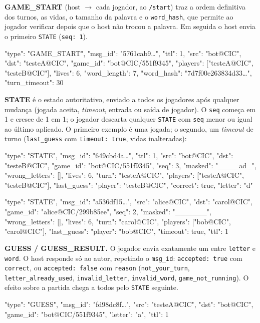 \documentclass[11pt,a4paper]{article}
\begin{document}
\textbf{GAME\_START} (host $\rightarrow$ cada jogador, ao \texttt{/start}) traz a ordem definitiva dos turnos, as vidas, o tamanho da palavra e o \texttt{word\_hash}, que permite ao jogador verificar depois que o host não trocou a palavra. Em seguida o host envia o primeiro \texttt{STATE} (\texttt{seq: 1}).
\begin{codigo}
{
  "type": "GAME_START",
  "msg_id": "5761cab9…",
  "ttl": 1,
  "src": "bot@CIC",
  "dst": "testeA@CIC",
  "game_id": "bot@CIC/551f9345",
  "players": ["testeA@CIC", "testeB@CIC"],
  "lives": 6,
  "word_length": 7,
  "word_hash": "7d7f00e263834d33…",
  "turn_timeout": 30
}
\end{codigo}
\textbf{STATE} é o estado autoritativo, enviado a todos os jogadores após qualquer mudança (jogada aceita, \emph{timeout}, entrada ou saída de jogador). O \texttt{seq} começa em 1 e cresce de 1 em 1; o jogador descarta qualquer \texttt{STATE} com \texttt{seq} menor ou igual ao último aplicado. O primeiro exemplo é uma jogada; o segundo, um \emph{timeout} de turno (\texttt{last\_guess} com \texttt{timeout: true}, vidas inalteradas):
\begin{codigo}
{
  "type": "STATE",
  "msg_id": "649cbd4a…",
  "ttl": 1,
  "src": "bot@CIC",
  "dst": "testeB@CIC",
  "game_id": "bot@CIC/551f9345",
  "seq": 3,
  "masked": "____ad_",
  "wrong_letters": [],
  "lives": 6,
  "turn": "testeA@CIC",
  "players": ["testeA@CIC", "testeB@CIC"],
  "last_guess": {"player": "testeB@CIC", "correct": true, "letter": "d"}
}
\end{codigo}
\begin{codigo}
{
  "type": "STATE",
  "msg_id": "a536df15…",
  "src": "alice@CIC",
  "dst": "carol@CIC",
  "game_id": "alice@CIC/299b85ee",
  "seq": 2,
  "masked": "______",
  "wrong_letters": [],
  "lives": 6,
  "turn": "carol@CIC",
  "players": ["bob@CIC", "carol@CIC"],
  "last_guess": {"player": "bob@CIC", "timeout": true},
  "ttl": 1
}
\end{codigo}
\textbf{GUESS / GUESS\_RESULT.} O jogador envia exatamente um entre \texttt{letter} e \texttt{word}. O host responde só ao autor, repetindo o \texttt{msg\_id}: \texttt{accepted: true} com \texttt{correct}, ou \texttt{accepted: false} com \texttt{reason} (\texttt{not\_your\_turn}, \texttt{letter\_already\_used}, \texttt{invalid\_letter}, \texttt{invalid\_word}, \texttt{game\_not\_running}). O efeito sobre a partida chega a todos pelo \texttt{STATE} seguinte.
\begin{codigo}
{
  "type": "GUESS",
  "msg_id": "fd98dc8f…",
  "src": "testeA@CIC",
  "dst": "bot@CIC",
  "game_id": "bot@CIC/551f9345",
  "letter": "a",
  "ttl": 1
}
\end{codigo}
\end{document}

